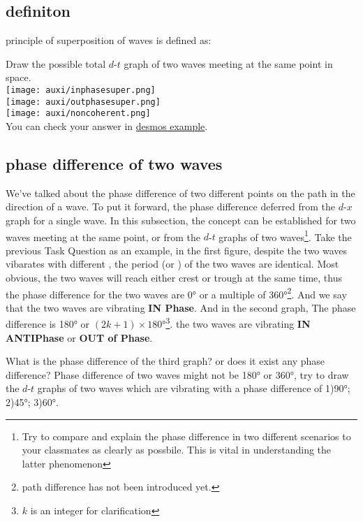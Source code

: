 \documentclass[a4paper]{tufte-handout}
\newenvironment{TaskBox} %
{\begin{tcolorbox}[breakable,colback=b1!30,colframe=b1,title=Task]} {\end{tcolorbox}}
\newenvironment{SummBox}
{\begin{tcolorbox}[breakable,colback=r1!30,colframe=r1,title=Summary]} {\end{tcolorbox}}
\begin{document}
\subsection{definiton}
\begin{SummBox}
principle of superposition of waves is defined as:
\vspace{1in}
\end{SummBox}

\begin{TaskBox}
Draw the possible total $d$-$t$ graph of two waves meeting at the same point in space.\\
\texttt{[image: auxi/inphasesuper.png]}\\
\texttt{[image: auxi/outphasesuper.png]}\\
\texttt{[image: auxi/noncoherent.png]}\\
You can check your answer in \href{https://www.desmos.com/calculator/ooybmqnwgq}{desmos example}. 
\end{TaskBox}

\subsection{phase difference of two waves}
We've talked about the phase difference of two different points on the path in the direction of a wave. To put it forward, the phase difference deferred from the $d$-$x$ graph for a single wave.
In this subsection, the concept can be established for two waves meeting at the same point, or from the $d$-$t$ graphs of two waves\footnote{Try to compare and explain the phase difference in two different scenarios to your classmates as clearly as possbile. This is vital in understanding the latter phenomenon}.
Take the previous Task Question as an example, in the first figure, despite the two waves vibarates with different \uline{\hspace{1in}}, the period (or \uline{\hspace{1in}}) of the two waves are identical. Most obvious, the two waves will reach either crest or trough at the same time, thus the phase difference for the two waves are \ang{0} or a multiple of \ang{360}\footnote{path difference has not been introduced yet.}. And we say that the two waves are vibrating \textbf{IN Phase}. And in the second graph, The phase difference is \ang{180} or $(2k+1)\times\ang{180}$\footnote{$k$ is an integer for clarification}. the two waves are vibrating \textbf{IN ANTIPhase} or \textbf{OUT of Phase}.
\begin{TaskBox}
What is the phase difference of the third graph? or does it exist any phase difference?
\tcblower
Phase difference of two waves might not be \ang{180} or \ang{360}, try to draw the $d$-$t$ graphs of two waves which are vibrating with a phase difference of 1)\ang{90}; 2)\ang{45}; 3)\ang{60}.
\vspace{2in}
\end{TaskBox}
\end{document}
